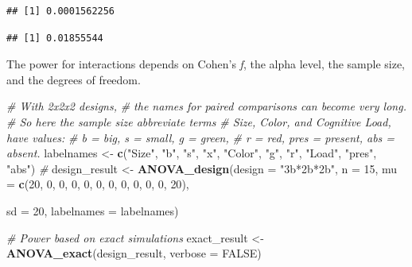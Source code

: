 \documentclass[
]{book}
\newenvironment{Shaded}{\begin{snugshade}}{\end{snugshade}}
\newcommand{\CommentTok}[1]{\textcolor[rgb]{0.56,0.35,0.01}{\textit{#1}}}
\newcommand{\DataTypeTok}[1]{\textcolor[rgb]{0.13,0.29,0.53}{#1}}
\newcommand{\DecValTok}[1]{\textcolor[rgb]{0.00,0.00,0.81}{#1}}
\newcommand{\KeywordTok}[1]{\textcolor[rgb]{0.13,0.29,0.53}{\textbf{#1}}}
\newcommand{\NormalTok}[1]{#1}
\newcommand{\OperatorTok}[1]{\textcolor[rgb]{0.81,0.36,0.00}{\textbf{#1}}}
\newcommand{\OtherTok}[1]{\textcolor[rgb]{0.56,0.35,0.01}{#1}}
\newcommand{\StringTok}[1]{\textcolor[rgb]{0.31,0.60,0.02}{#1}}
\begin{document}
\begin{Shaded}
\end{Shaded}

\begin{verbatim}
## [1] 0.0001562256
\end{verbatim}

\begin{Shaded}
\end{Shaded}

\begin{verbatim}
## [1] 0.01855544
\end{verbatim}

The power for interactions depends on Cohen's \emph{f}, the alpha level, the sample size, and the degrees of freedom.

\begin{Shaded}
\begin{Highlighting}[]
\CommentTok{# With 2x2x2 designs, }
\CommentTok{# the names for paired comparisons can become very long. }
\CommentTok{# So here the sample size abbreviate terms}
\CommentTok{# Size, Color, and Cognitive Load, have values:}
\CommentTok{# b = big, s = small, g = green, }
\CommentTok{# r = red, pres = present, abs = absent.  }
\NormalTok{labelnames <-}\StringTok{ }\KeywordTok{c}\NormalTok{(}\StringTok{"Size"}\NormalTok{, }\StringTok{"b"}\NormalTok{, }\StringTok{"s"}\NormalTok{, }\StringTok{"x"}\NormalTok{, }\StringTok{"Color"}\NormalTok{, }\StringTok{"g"}\NormalTok{, }\StringTok{"r"}\NormalTok{, }
                \StringTok{"Load"}\NormalTok{, }\StringTok{"pres"}\NormalTok{, }\StringTok{"abs"}\NormalTok{) }\CommentTok{#}
\NormalTok{design_result <-}\StringTok{ }\KeywordTok{ANOVA_design}\NormalTok{(}\DataTypeTok{design =} \StringTok{"3b*2b*2b"}\NormalTok{, }
                              \DataTypeTok{n =} \DecValTok{15}\NormalTok{, }
                              \DataTypeTok{mu =} \KeywordTok{c}\NormalTok{(}\DecValTok{20}\NormalTok{, }\DecValTok{0}\NormalTok{, }\DecValTok{0}\NormalTok{, }\DecValTok{0}\NormalTok{, }\DecValTok{0}\NormalTok{, }
                                     \DecValTok{0}\NormalTok{, }\DecValTok{0}\NormalTok{, }\DecValTok{0}\NormalTok{, }\DecValTok{0}\NormalTok{, }\DecValTok{0}\NormalTok{, }\DecValTok{0}\NormalTok{, }\DecValTok{20}\NormalTok{), }
                              
                              \DataTypeTok{sd =} \DecValTok{20}\NormalTok{, }
                              \DataTypeTok{labelnames =}\NormalTok{ labelnames) }

\CommentTok{# Power based on exact simulations}
\NormalTok{exact_result <-}\StringTok{ }\KeywordTok{ANOVA_exact}\NormalTok{(design_result,}
                            \DataTypeTok{verbose =} \OtherTok{FALSE}\NormalTok{)}
\end{Highlighting}
\end{Shaded}
\end{document}
